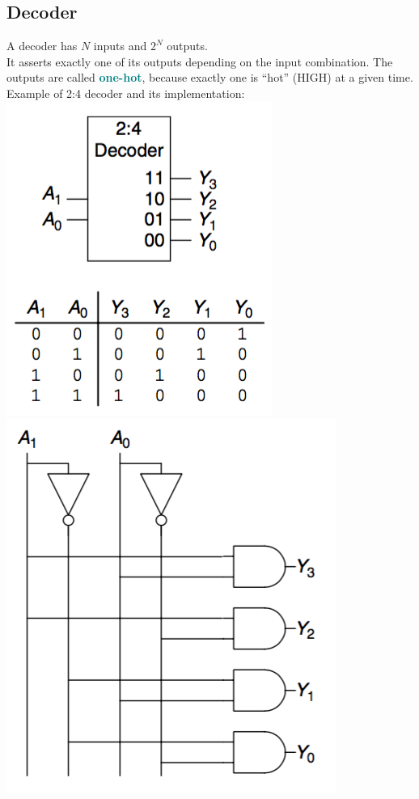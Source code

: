 \documentclass[12pt]{article}
\theoremstyle{definition}
\newcommand{\defnterm}[1]{\textbf{\textcolor{teal}{#1}}\index{#1}}
\begin{document}
  \newpage
  \subsection{Decoder}
  A decoder has $N$ inputs and $2^{N}$ outputs. \\
  It asserts exactly one of its outputs depending on the input combination.
  The outputs are called \defnterm{one-hot}, because exactly one is ``hot'' (HIGH) at a given time. \\

  Example of 2:4 decoder and its implementation: \\
  \includegraphics{pictures/2_4_decoder.png}
  \includegraphics{pictures/2_4_decoder_implementation.png} \\
\end{document}
